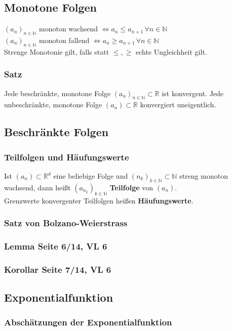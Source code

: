 \documentclass[10pt,a4paper^, twocolumn]{article}
\begin{document}
\subsection{Monotone Folgen}
	$(a_n)_{n \in \mathbb{N}}$ monoton wachsend $\Leftrightarrow a_n \leq a_{n+1} 
	\, \forall n \in \mathbb{N}$\\
	$(a_n)_{n \in \mathbb{N}}$ monoton fallend $\Leftrightarrow a_n \geq a_{n+1} 
	\, \forall n \in \mathbb{N}$\\
	Strenge Monotonie gilt, falls statt $\leq, \geq$ echte Ungleichheit gilt.\\
	\subsubsection{Satz}
		Jede beschränkte, monotone Folge $(a_n)_{n \in \mathbb{N}} \subset \mathbb{R}$
		ist konvergent.
		Jede unbeschränkte, monotone Folge $(a_n)  \subset \mathbb{R}$ konvergiert 
		uneigentlich.
\subsection{Beschränkte Folgen}
	\subsubsection{Teilfolgen und Häufungswerte}
		Ist $(a_n) \subset \mathbb{R}^d$ eine beliebige Folge und 
		$(n_k)_{k \in \mathbb{N}} \subset \mathbb{N} $ 
		streng monoton wachsend, dann heißt $ (a_{n_k})_{k \in \mathbb{N}}$
		\textbf{Teilfolge} von $(a_n)$.\\
		Grenzwerte konvergenter Teilfolgen heißen \textbf{Häufungswerte}.
	\subsubsection{Satz von Bolzano-Weierstrass}
	\subsubsection{Lemma Seite 6/14, VL 6}
	\subsubsection{Korollar Seite 7/14, VL 6}
	\subsection{Exponentialfunktion}
	\subsubsection{Abschätzungen der Exponentialfunktion}
\end{document}
